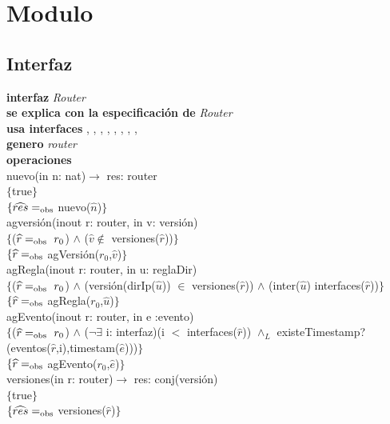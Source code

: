 \section{Modulo }

\subsection*{Interfaz}
\textbf{interfaz} \textit{Router}\\
\textbf{se explica con la especificaci\'on de} \textit{Router}\\
\textbf{usa interfaces} , , , , , , , , \\
\textbf{genero} \textit{router}\\
\textbf{operaciones}\\

nuevo(in n: nat)$\rightarrow$ res: router\\
$\{$true$\}$\\
$\{\widehat{res} =_{\mathrm{obs}}$ nuevo($\widehat{n}$)$\}$\\

agversi\'on(inout r: router, in v: versi\'on)\\
$\{$($\widehat{r} =_{\mathrm{obs}}\ r_0$) $\wedge$ ($\widehat{v} \notin$ versiones($\widehat{r}$))$\}$\\
$\{\widehat{r} =_{\mathrm{obs}}$ agVersi\'on($r_0$,$\widehat{v}$)$\}$\\

agRegla(inout r: router, in u: reglaDir)\\
$\{$($\widehat{r} =_{\mathrm{obs}}\ r_0$) $\wedge$ (versi\'on(dirIp($\widehat{u}$)) $\in$ versiones($\widehat{r}$)) $\wedge$ (inter($\widehat{u}$) interfaces($\widehat{r}$))$\}$\\
$\{\widehat{r} =_{\mathrm{obs}}$ agRegla($r_0$,$\widehat{u}$)$\}$\\

agEvento(inout r: router, in e :evento)\\
$\{$($\widehat{r} =_{\mathrm{obs}}\ r_0$) $\wedge$ ($\neg \exists$ i: interfaz)(i $<$ interfaces($\widehat{r}$)) $\wedge_L$ existeTimestamp?(eventos($\widehat{r}$,i),timestam($\widehat{e}$)))$\}$\\
$\{\widehat{r}=_{\mathrm{obs}}$ agEvento($r_0$,$\widehat{e}$)$\}$\\

versiones(in r: router)$\longrightarrow$ res: conj(versi\'on)\\
$\{$true$\}$\\
$\{\widehat{res}=_{\mathrm{obs}}$ versiones($\widehat{r}$)$\}$\\

